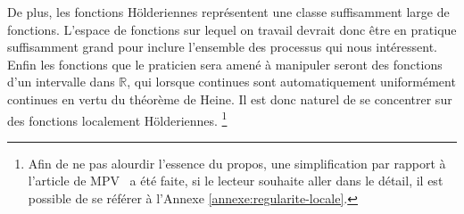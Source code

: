 De plus, les fonctions Hölderiennes représentent une classe suffisamment large de fonctions.
L'espace de fonctions sur lequel on travail devrait donc être en pratique suffisamment grand pour inclure l'ensemble des processus qui nous intéressent. Enfin les fonctions que le praticien sera amené à manipuler seront des fonctions d'un intervalle dans $\mathds R$, qui lorsque continues sont automatiquement uniformément continues en vertu du théorème de Heine. Il est donc naturel de se concentrer sur des fonctions localement Hölderiennes. \footnote{Afin de ne pas alourdir l'essence du propos, une simplification par rapport à l'article de MPV~\cite{maissoro-SmoothnessFTSweakDep} a été faite, si le lecteur souhaite aller dans le détail, il est possible de se référer à l'Annexe \ref{annexe:regularite-locale}.}
